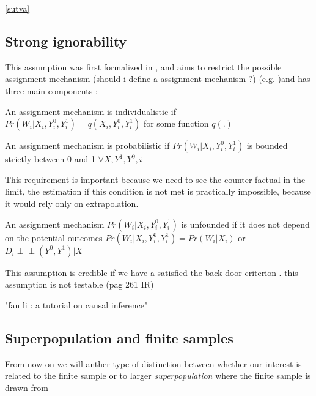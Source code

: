 \ref{sutva}

\subsection{Strong ignorability}
This assumption was first formalized in \citep{rosenbaum1983central} , and aims to restrict the possible assignment mechanism  (should i define a assignment mechanism ?) (e.g. )and has three main components :

\begin{ass}
An assignment mechanism is individualistic if $Pr(W_i| X_i , Y_i^0 ,Y_i^1) = q( X_i , Y_i^0 ,Y_i^1)$ for some function $q(.)$
\end{ass}

\begin{ass}
An assignment mechanism is probabilistic if $Pr(W_i| X_i , Y_i^0 ,Y_i^1)$ is bounded strictly between 0 and 1 $\forall X,Y^1,Y^0,i$
\end{ass}
This requirement is important because we need to see the counter factual in the limit, the estimation if this condition is not met is practically impossible, because it would rely only on extrapolation.  


\begin{ass}
An assignment mechanism $Pr(W_i| X_i , Y_i^0 ,Y_i^1)$ is unfounded if  it does not depend on the potential outcomes $Pr(W_i| X_i , Y_i^0 ,Y_i^1)=Pr(W_i| X_i )$ or $D_i  \perp\!\!\!\perp (Y^{0},Y^{1}) | X$
\end{ass}
This assumption is credible if we have a satisfied  the back-door criterion \citep{cunningham2021causal}.
this assumption is not testable (pag 261 IR)





"fan li : a tutorial on causal inference"

\subsection{Superpopulation and finite samples}
From now on we will anther type of distinction between whether our interest is related to the finite sample  or to larger \textit{superpopulation} where the finite sample is drawn from 

